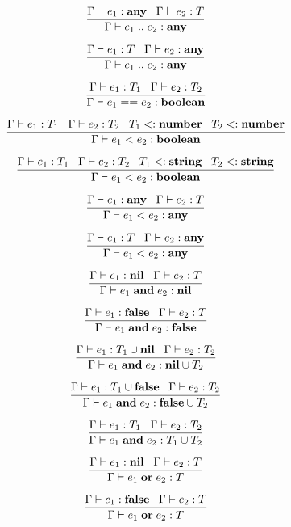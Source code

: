 \[
\dfrac{\Gamma \vdash e_{1}:\mathbf{any} \;\;\;
       \Gamma \vdash e_{2}:T}
      {\Gamma \vdash e_{1} \; {..} \; e_{2}:\mathbf{any}}
\]

\[
\dfrac{\Gamma \vdash e_{1}:T \;\;\;
       \Gamma \vdash e_{2}:\mathbf{any}}
      {\Gamma \vdash e_{1} \; {..} \; e_{2}:\mathbf{any}}
\]

\[
\dfrac{\Gamma \vdash e_{1}:T_{1} \;\;\;
       \Gamma \vdash e_{2}:T_{2}}
      {\Gamma \vdash e_{1} == e_{2}:\mathbf{boolean}}
\]

\[
\dfrac{\Gamma \vdash e_{1}:T_{1} \;\;\;
       \Gamma \vdash e_{2}:T_{2} \;\;\;
       T_{1} <: \mathbf{number} \;\;\;
       T_{2} <: \mathbf{number}}
      {\Gamma \vdash e_{1} < e_{2}:\mathbf{boolean}}
\]

\[
\dfrac{\Gamma \vdash e_{1}:T_{1} \;\;\;
       \Gamma \vdash e_{2}:T_{2} \;\;\;
       T_{1} <: \mathbf{string} \;\;\;
       T_{2} <: \mathbf{string}}
      {\Gamma \vdash e_{1} < e_{2}:\mathbf{boolean}}
\]

\[
\dfrac{\Gamma \vdash e_{1}:\mathbf{any} \;\;\;
       \Gamma \vdash e_{2}:T}
      {\Gamma \vdash e_{1} < e_{2}:\mathbf{any}}
\]

\[
\dfrac{\Gamma \vdash e_{1}:T \;\;\;
       \Gamma \vdash e_{2}:\mathbf{any}}
      {\Gamma \vdash e_{1} < e_{2}:\mathbf{any}}
\]

\[
\dfrac{\Gamma \vdash e_{1}:\mathbf{nil} \;\;\;
       \Gamma \vdash e_{2}:T}
      {\Gamma \vdash e_{1} \; \mathbf{and} \; e_{2}:\mathbf{nil}}
\]

\[
\dfrac{\Gamma \vdash e_{1}:\mathbf{false} \;\;\;
       \Gamma \vdash e_{2}:T}
      {\Gamma \vdash e_{1} \; \mathbf{and} \; e_{2}:\mathbf{false}}
\]

\[
\dfrac{\Gamma \vdash e_{1}:T_{1} \cup \mathbf{nil} \;\;\;
       \Gamma \vdash e_{2}:T_{2}}
      {\Gamma \vdash e_{1} \; \mathbf{and} \; e_{2}:\mathbf{nil} \cup T_{2}}
\]

\[
\dfrac{\Gamma \vdash e_{1}:T_{1} \cup \mathbf{false} \;\;\;
       \Gamma \vdash e_{2}:T_{2}}
      {\Gamma \vdash e_{1} \; \mathbf{and} \; e_{2}:\mathbf{false} \cup T_{2}}
\]

\[
\dfrac{\Gamma \vdash e_{1}:T_{1} \;\;\;
       \Gamma \vdash e_{2}:T_{2}}
      {\Gamma \vdash e_{1} \; \mathbf{and} \; e_{2}:T_{1} \cup T_{2}}
\]

\[
\dfrac{\Gamma \vdash e_{1}:\mathbf{nil} \;\;\;
       \Gamma \vdash e_{2}:T}
      {\Gamma \vdash e_{1} \; \mathbf{or} \; e_{2}:T}
\]

\[
\dfrac{\Gamma \vdash e_{1}:\mathbf{false} \;\;\;
       \Gamma \vdash e_{2}:T}
      {\Gamma \vdash e_{1} \; \mathbf{or} \; e_{2}:T}
\]

